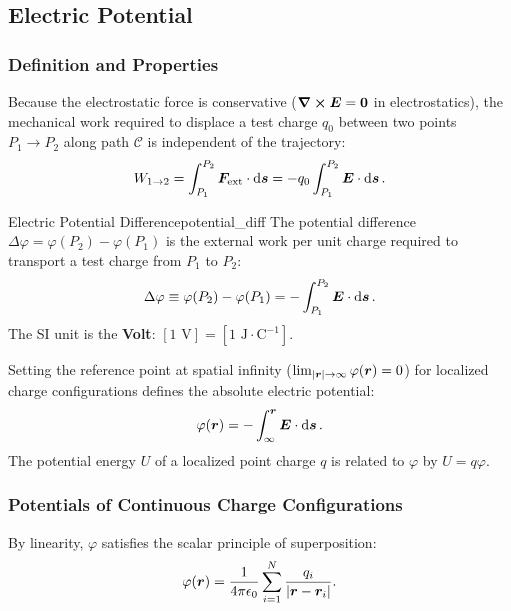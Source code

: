\subsection{Electric Potential}

\subsubsection{Definition and Properties}

Because the electrostatic force is conservative ($\curl{\vb*{E}} = \vb*{0}$ in electrostatics), the mechanical work required to displace a test charge $q_0$ between two points $P_1 \to P_2$ along path $\mathcal{C}$ is independent of the trajectory:
\begin{equation}
    W_{1 \to 2} = \int_{P_1}^{P_2} \vb*{F}_{\text{ext}} \cdot \dd{\vb*{s}} = - q_0 \int_{P_1}^{P_2} \vb*{E} \cdot \dd{\vb*{s}}.
\end{equation}

\begin{definition}{Electric Potential Difference}{potential_diff}
The potential difference $\Delta\varphi = \varphi(P_2) - \varphi(P_1)$ is the external work per unit charge required to transport a test charge from $P_1$ to $P_2$:
\begin{equation}
    \Delta\varphi \equiv \varphi(P_2) - \varphi(P_1) = -\int_{P_1}^{P_2} \vb*{E} \cdot \dd{\vb*{s}}.
\end{equation}
The SI unit is the \textbf{Volt}: $[1\text{ V}] = [1\text{ J}\cdot\text{C}^{-1}]$.
\end{definition}

Setting the reference point at spatial infinity ($\lim_{|\vb*{r}| \to \infty} \varphi(\vb*{r}) = 0$) for localized charge configurations defines the absolute electric potential:
\begin{equation}
    \varphi(\vb*{r}) = -\int_{\infty}^{\vb*{r}} \vb*{E} \cdot \dd{\vb*{s}}.
\end{equation}
The potential energy $U$ of a localized point charge $q$ is related to $\varphi$ by $U = q\varphi$.

\subsubsection{Potentials of Continuous Charge Configurations}

By linearity, $\varphi$ satisfies the scalar principle of superposition:
\begin{equation}
    \varphi(\vb*{r}) = \frac{1}{4\pi\epsilon_0} \sum_{i=1}^N \frac{q_i}{|\vb*{r} - \vb*{r}_i|}.
\end{equation}

